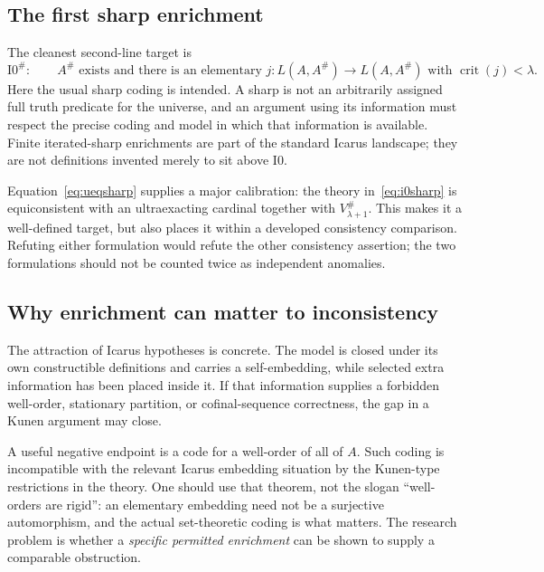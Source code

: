 \documentclass[11pt,letterpaper]{article}
\theoremstyle{definition}
\newcommand{\crit}{\operatorname{crit}}
\newcommand{\Izero}{\mathrm{I0}}
\newcommand{\Isharp}{\mathrm{I0}^{\#}}
\begin{document}
\subsection{The first sharp enrichment}

The cleanest second-line target is
\begin{equation}
 \Isharp:\qquad A^{\#}\text{ exists and there is an elementary }
 j:L(A,A^{\#})\to L(A,A^{\#})
 \text{ with }\crit(j)<\lambda.
 \label{eq:i0sharp}
\end{equation}
Here the usual sharp coding is intended. A sharp is not an arbitrarily assigned full truth predicate for the universe, and an argument using its information must respect the precise coding and model in which that information is available. Finite iterated-sharp enrichments are part of the standard Icarus landscape; they are not definitions invented merely to sit above $\Izero$. \cite{dimonte}

Equation~\eqref{eq:ueqsharp} supplies a major calibration: the theory in~\eqref{eq:i0sharp} is equiconsistent with an ultraexacting cardinal together with $V_{\lambda+1}^{\#}$. This makes it a well-defined target, but also places it within a developed consistency comparison. Refuting either formulation would refute the other consistency assertion; the two formulations should not be counted twice as independent anomalies. \cite[Corollary~4.9]{abgl}

\subsection{Why enrichment can matter to inconsistency}

The attraction of Icarus hypotheses is concrete. The model is closed under its own constructible definitions and carries a self-embedding, while selected extra information has been placed inside it. If that information supplies a forbidden well-order, stationary partition, or cofinal-sequence correctness, the gap in a Kunen argument may close.

A useful negative endpoint is a code for a well-order of all of $A$. Such coding is incompatible with the relevant Icarus embedding situation by the Kunen-type restrictions in the theory. One should use that theorem, not the slogan ``well-orders are rigid'': an elementary embedding need not be a surjective automorphism, and the actual set-theoretic coding is what matters. The research problem is whether a \emph{specific permitted enrichment} can be shown to supply a comparable obstruction. \cite{dimonte}
\end{document}
